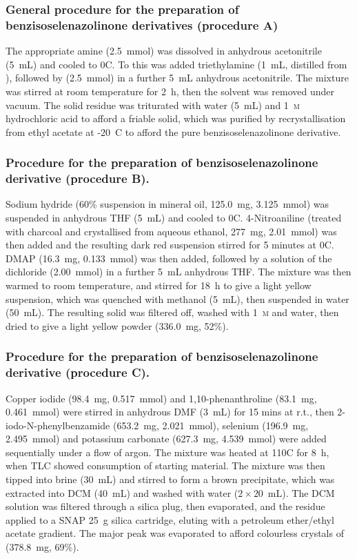 \begin{refsection}
\subsubsection[General procedure A]{General procedure for the preparation of benzisoselenazolinone derivatives  (procedure A)}
The appropriate amine (2.5~mmol) was dissolved in anhydrous acetonitrile (5~mL) and cooled to 0\degree{}C.
To this was added triethylamine (1~mL, distilled from ), followed by  (2.5~mmol) in a further 5~mL anhydrous acetonitrile.
The mixture was stirred at room temperature for 2~h, then the solvent was removed under vacuum.
The solid residue was triturated with water (5~mL) and 1~\textsc{m} hydrochloric acid to afford a friable solid, which was purified by recrystallisation from ethyl acetate at -20\degree~C to afford the pure benzisoselenazolinone derivative.

\subsubsection[General procedure B]{Procedure for the preparation of benzisoselenazolinone derivative  (procedure B).}
Sodium hydride (60\% suspension in mineral oil, 125.0~mg, 3.125~mmol) was suspended in anhydrous THF (5~mL) and cooled to 0\degree{}C.
4-Nitroaniline (treated with charcoal and crystallised from aqueous ethanol, 277~mg, 2.01~mmol) was then added and the resulting dark red suspension stirred for 5 minutes at 0\degree{}C.
DMAP (16.3~mg, 0.133~mmol) was then added, followed by a solution of the dichloride  (2.00~mmol) in a further 5~mL anhydrous THF.\@
The mixture was then warmed to room temperature, and stirred for 18~h to give a light yellow suspension, which was quenched with methanol (5~mL), then suspended in water (50~mL).
The resulting solid was filtered off, washed with 1~\textsc{m}  and water, then dried to give a light yellow powder (336.0~mg, 52\%).

\subsubsection[General procedure C]{Procedure for the preparation of benzisoselenazolinone derivative  (procedure C).}
Copper iodide (98.4~mg, 0.517~mmol) and 1,10-phenanthroline (83.1~mg, 0.461~mmol) were stirred in anhydrous DMF (3~mL) for 15 mins at r.t., then 2-iodo-N-phenylbenz\-amide (653.2~mg, 2.021~mmol), selenium (196.9~mg, 2.495~mmol) and potassium carbonate (627.3~mg, 4.539~mmol) were added sequentially under a flow of argon.
The mixture was heated at 110\degree{}C for 8~h, when TLC showed consumption of starting material.
The mixture was then tipped into brine (30~mL) and stirred to form a brown precipitate, which was extracted into DCM (40~mL) and washed with water ($ 2 \times 20 $~mL).
The DCM solution was filtered through a silica plug, then evaporated, and the residue applied to a SNAP 25~g silica cartridge, eluting with a petroleum ether/ethyl acetate gradient.
The major peak was evaporated to afford colourless crystals of  (378.8~mg, 69\%).


\end{refsection}
